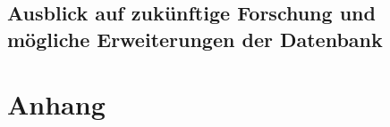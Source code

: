 \documentclass[12pt, a4paper, ngerman, bidi=default]{article}
\begin{document}
\subsection{Ausblick auf zukünftige Forschung und mögliche Erweiterungen der Datenbank}
\newpage

\pagecolor{white}
\newpage
\begingroup
\small
\singlespacing%
\printbibliography[
heading=bibintoc,
title={Bibliographie}%
]%
\endgroup


\newpage
\appendix
\section{Anhang}
\begingroup
\small
\end{document}
